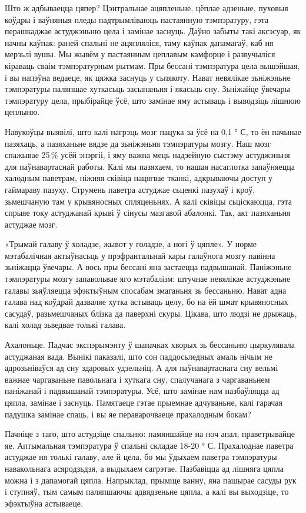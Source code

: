 Што ж адбываецца цяпер? Цэнтральнае ацяпленьне, цёплае адзеньне, пуховыя коўдры і ваўняныя пледы падтрымліваюць пастаянную тэмпэратуру, гэта перашкаджае астуджэньню цела і замінае заснуць. Даўно забыты такі аксэсуар, як начны каўпак: раней спальні не ацяпляліся, таму каўпак дапамагаў, каб ня мерзьлі вушы. Мы жывём у пастаянным цеплавым камфорце і развучыліся кіраваць сваім тэмпэратурным рытмам. Пры бессані тэмпэратура цела вышэйшая, і вы напэўна ведаеце, як цяжка заснуць у сьпякоту. Нават невялікае зьніжэньне тэмпэратуры паляпшае хуткасьць засынаньня і якасьць сну. Зьніжайце ўвечары тэмпэратуру цела, прыбірайце ўсё, што замінае яму астываць і выводзіць лішнюю цеплыню.

Навукоўцы выявілі, што калі нагрэць мозг пацука за ўсё на 0,1 ° С, то ён пачынае пазяхаць, а пазяханьне вядзе да зьніжэньня тэмпэратуры мозгу. Наш мозг спажывае 25\,\% усёй энэргіі, і яму важна мець надзейную сыстэму астуджэньня для паўнавартаснай работы. Калі мы пазяхаем, то нашая насаглотка запаўняецца халодным паветрам, ніжняя сківіца нацягвае тканкі, адкрываючы доступ у гаймараву пазуху. Струмень паветра астуджае сьценкі пазухаў і кроў, зьмешчаную там у крывяносных спляценьнях. А калі сківіцы сьціскаюцца, гэта спрыяе току астуджанай крыві ў сінусы мазгавой абалонкі. Так, акт пазяханьня астуджае мозг.

«Трымай галаву ў холадзе, жывот у голадзе, а ногі ў цяпле». У норме мэтабалічная актыўнасьць у прэфрантальнай кары галаўнога мозгу павінна зьніжацца ўвечары. А вось пры бессані яна застаецца падвышанай. Паніжэньне тэмпэратуры мозгу запавольвае яго мэтабалізм: штучнае невялікае астуджэньне галавы зьяўляецца эфэктыўным спосабам змаганьня зь бессаньню. Нават адна галава над коўдрай дазваляе хутка астываць целу, бо на ёй шмат крывяносных сасудаў, разьмешчаных блізка да паверхні скуры. Цікава, што людзі не дрыжаць, калі холад зьведвае толькі галава.

Ахалоньце. Падчас экспэрымэнту ў шапачках хворых зь бессаньню цыркулявала астуджаная вада. Вынікі паказалі, што сон паддосьледных амаль нічым не адрозьніваўся ад сну здаровых удзельніц. А для паўнавартаснага сну вельмі важнае чаргаваньне павольнага і хуткага сну, спалучанага з чаргаваньнем паніжанай і падвышанай тэмпэратуры. Усё, што замінае нам пазбаўляцца ад цяпла, замінае і заснуць. Памятаеце гэтае прыемнае адчуваньне, калі гарачая падушка замінае спаць, і вы яе пераварочваеце прахалодным бокам?

Пачніце з таго, што астудзіце спальню: памяншайце на ноч апал, праветрывайце яе. Аптымальная тэмпэратура ў спальні складае 18-20 ° С. Прахалоднае паветра астуджае ня толькі галаву, але й цела, бо мы ўдыхаем паветра тэмпэратуры навакольнага асяродзьдзя, а выдыхаем сагрэтае. Пазбавіцца ад лішняга цяпла можна і з дапамогай цяпла. Напрыклад, прыміце ванну, яна пашырае сасуды рук і ступняў, тым самым паляпшаючы адвядзеньне цяпла, а калі вы выходзіце, то эфэктыўна астываеце.

